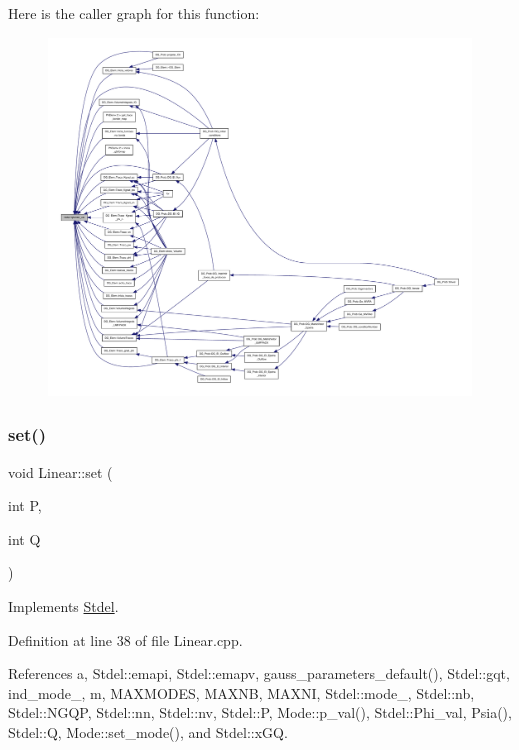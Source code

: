 Here is the caller graph for this function\+:
\nopagebreak
\begin{figure}[H]
\begin{center}
\leavevmode
\includegraphics[width=350pt]{classStdel_a457d20e34fb7a32eb1e4aca6c19f53a2_icgraph}
\end{center}
\end{figure}
\mbox{\label{classLinear_a5cd90cf088a548e3440c905c063d9d6f}} 
\subsubsection{\texorpdfstring{set()}{set()}}
{\footnotesize\ttfamily void Linear\+::set (\begin{DoxyParamCaption}\item[{int}]{P,  }\item[{int}]{Q }\end{DoxyParamCaption})\hspace{0.3cm}{\ttfamily [virtual]}}



Implements \hyperlink{classStdel_ab42c46493ab17be6f2642a558fea8a05}{Stdel}.



Definition at line 38 of file Linear.\+cpp.



References a, Stdel\+::emapi, Stdel\+::emapv, gauss\+\_\+parameters\+\_\+default(), Stdel\+::gqt, ind\+\_\+mode\+\_\+, m, M\+A\+X\+M\+O\+D\+ES, M\+A\+X\+NB, M\+A\+X\+NI, Stdel\+::mode\+\_\+, Stdel\+::nb, Stdel\+::\+N\+G\+QP, Stdel\+::nn, Stdel\+::nv, Stdel\+::P, Mode\+::p\+\_\+val(), Stdel\+::\+Phi\+\_\+val, Psia(), Stdel\+::Q, Mode\+::set\+\_\+mode(), and Stdel\+::x\+GQ.

